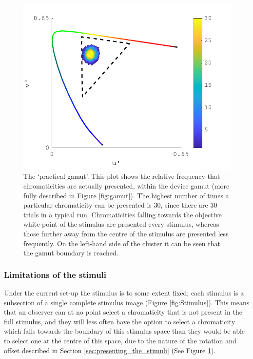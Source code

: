 \begin{figure}[hbtp]
\includegraphics[max width=\textwidth]{figs/tablet/practical_gamut.pdf}
\caption{The `practical gamut'. This plot shows the relative frequency that chromaticities are actually presented, within the device gamut (more fully described in Figure \ref{fig:gamut}). The highest number of times a particular chromaticity can be presented is 30, since there are 30 trials in a typical run. Chromaticities falling towards the objective white point of the stimulus are presented every stimulus, whereas those further away from the centre of the stimulus are presented less frequently. On the left-hand side of the cluster it can be seen that the gamut boundary is reached.}
\label{fig:practical}
\end{figure}

\subsubsection{Limitations of the stimuli} \label{sec:limitations}
Under the current set-up the stimulus is to some extent fixed; each stimulus is a subsection of a single complete stimulus image (Figure \ref{fig:Stimulus}). This means that an observer can at no point select a chromaticity that is not present in the full stimulus, and they will less often have the option to select a chromaticity which falls towards the boundary of this stimulus space than they would be able to select one at the centre of this space, due to the nature of the rotation and offset described in Section \ref{sec:presenting_the_stimuli} (See Figure \ref{fig:practical}). 


